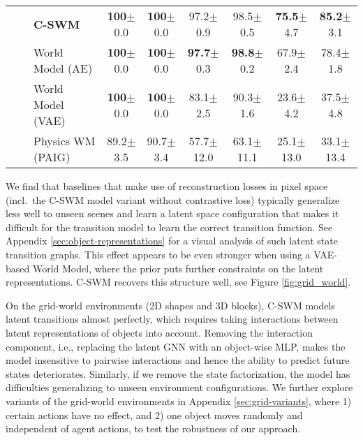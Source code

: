 \documentclass{article} %
\begin{document}
\begin{table}[ht]
\begin{adjustbox}{center,width=0.9\linewidth}
\begin{tabular}{lllcccccc}
\midrule
\parbox[t]{0.1mm}{} & \parbox[t]{2mm}{} & \bf C-SWM & {\bf 100}{\color{lightgrey}\tiny$\pm$0.0}  & {\bf 100}{\color{lightgrey}\tiny$\pm$0.0} &  97.2{\color{lightgrey}\tiny$\pm$0.9}  & 98.5{\color{lightgrey}\tiny$\pm$0.5} & {\bf 75.5}{\color{lightgrey}\tiny$\pm$4.7}  & {\bf 85.2}{\color{lightgrey}\tiny$\pm$3.1}\\
&&World Model (AE) & {\bf 100}{\color{lightgrey}\tiny$\pm$0.0}  & {\bf 100}{\color{lightgrey}\tiny$\pm$0.0} & {\bf 97.7}{\color{lightgrey}\tiny$\pm$0.3}  & {\bf 98.8}{\color{lightgrey}\tiny$\pm$0.2} & 67.9{\color{lightgrey}\tiny$\pm$2.4}  & 78.4{\color{lightgrey}\tiny$\pm$1.8}\\
&&World Model (VAE) & {\bf 100}{\color{lightgrey}\tiny$\pm$0.0}  & {\bf 100}{\color{lightgrey}\tiny$\pm$0.0} & 83.1{\color{lightgrey}\tiny$\pm$2.5}  & 90.3{\color{lightgrey}\tiny$\pm$1.6} & 23.6{\color{lightgrey}\tiny$\pm$4.2}  & 37.5{\color{lightgrey}\tiny$\pm$4.8}\\
&& Physics WM (PAIG) & 89.2{\color{lightgrey}\tiny$\pm$3.5}  & 90.7{\color{lightgrey}\tiny$\pm$3.4} & 57.7{\color{lightgrey}\tiny$\pm$12.0}  & 63.1{\color{lightgrey}\tiny$\pm$11.1} & 25.1{\color{lightgrey}\tiny$\pm$13.0}  & 33.1{\color{lightgrey}\tiny$\pm$13.4}\\
\bottomrule
\end{tabular}
\end{adjustbox}
\end{table}

We find that baselines that make use of reconstruction losses in pixel space (incl.~the C-SWM model variant without contrastive loss) typically generalize less well to unseen scenes and learn a latent space configuration that makes it difficult for the transition model to learn the correct transition function. See Appendix \ref{sec:object-representations} for a visual analysis of such latent state transition graphs. This effect appears to be even stronger when using a VAE-based World Model, where the prior puts further constraints on the latent representations. C-SWM recovers this structure well, see Figure \ref{fig:grid_world}.

On the grid-world environments (2D shapes and 3D blocks), C-SWM models latent transitions almost perfectly, which requires taking interactions between latent representations of objects into account. Removing the interaction component, i.e., replacing the latent GNN with an object-wise MLP, makes the model insensitive to pairwise interactions and hence the ability to predict future states deteriorates. Similarly, if we remove the state factorization, the model has difficulties generalizing to unseen environment configurations. We further explore variants of the grid-world environments in Appendix \ref{sec:grid-variants}, where 1) certain actions have no effect, and 2) one object moves randomly and independent of agent actions, to test the robustness of our approach.
\end{document}
